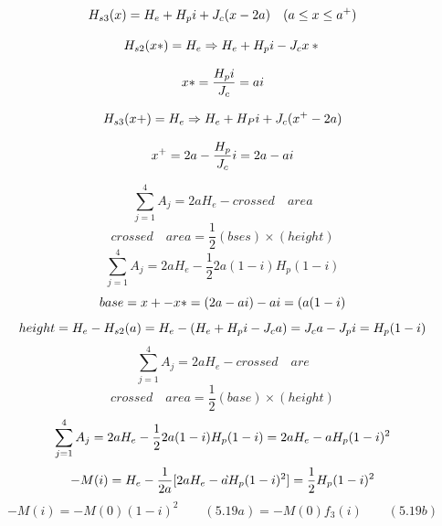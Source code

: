 \begin{equation}%
H_{s3}(x)=H_{e}+H_{p}i+J_{c}(x-2a)\quad(a\leq x\leq a^{+})\\
\end{equation}

\begin{equation}%
H_{s2}(x*)=H_{e}\Rightarrow H_{e}+H_{p}i-J_{c}x*\\
\end{equation}

\begin{equation}%
x*=\frac{H_{p}i}{J_{c}}=ai\\
\end{equation}

\begin{equation}%
H_{s3}(x+)=H_{e}\Rightarrow H_{e}+H_{P}i+J_{c}(x^{+}-2a)\\
\end{equation}

\begin{equation}%
x^{+}=2a-\frac{H_{p}}{J_{c}}i=2a-ai\\
\end{equation}


\begin{equation}%
\sum_{j=1}^{4}A_{j}=2aH_{e}-crossed\quad area
\end{equation}
\begin{equation}%
crossed\quad area=\frac{1}{2}(bses)\times(height)
\end{equation}
\begin{equation}%
\sum_{j=1}^{4}A_{j}=2aH_{e}-\frac{1}{2}2a(1-i)H_{p}(1-i)
\end{equation}
\begin{equation}%
base=x+-x*=(2a-ai)-ai=(a(1-i)\\
\end{equation}
\begin{equation}%
height=H_{e}-H_{s2}(a)=H_{e}-(H_{e}+H_{p}i-J_{c}a)\\
=J_{c}a-J_{p}i=H_{p}(1-i)
\end{equation}
\begin{equation}%
\sum_{j=1}^{4}A_{j}=2aH_{e}-crossed\quad are
\end{equation}
\begin{equation}%
crossed\quad area=\frac{1}{2}(base)\times(height)
\end{equation}
\begin{equation}%
\sum_{j=1}^{4}A_{j}=2aH_{e}-\frac{1}{2}2a(1-i)H_{p}(1-i)\\
=2aH_{e}-aH_{p}(1-i)^{2}
\end{equation}
\begin{equation}%
-M(i)=H_{e}-\frac{1}{2a}[2aH_{e}-a \grave{}H_{p}(1-i)^{2}]\\
=\frac{1}{2}H_{p}(1-i)^{2}
\end{equation}
\begin{equation}%
-M(i)=-M(0)(1-i)^{2}\qquad(5.19a)
=-M(0)f_{3}(i)\qquad(5.19b)
\end{equation}



